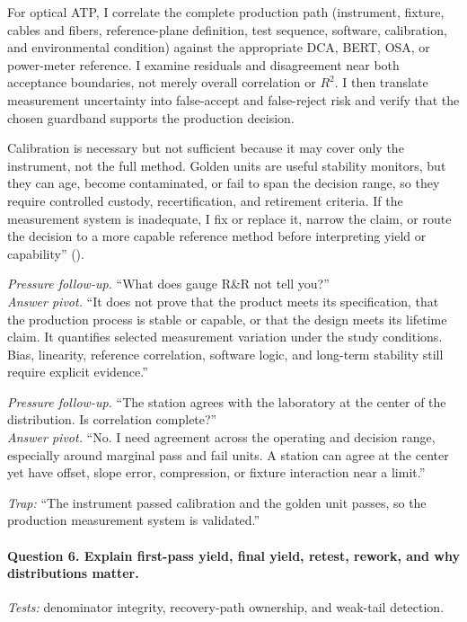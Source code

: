 For optical ATP, I correlate the complete production path (instrument, fixture,
cables and fibers, reference-plane definition, test sequence, software,
calibration, and environmental condition) against the appropriate DCA, BERT,
OSA, or power-meter reference. I examine residuals and disagreement
near both acceptance boundaries, not merely overall correlation or
$R^2$. I then translate measurement uncertainty into false-accept and
false-reject risk and verify that the chosen guardband supports the production
decision.

Calibration is necessary but not sufficient because it may cover only the
instrument, not the full method. Golden units are useful stability monitors,
but they can age, become contaminated, or fail to span the decision range, so
they require controlled custody, recertification, and retirement criteria. If
the measurement system is inadequate, I fix or replace it, narrow the claim, or
route the decision to a more capable reference method before interpreting
yield or capability''
().

\textit{Pressure follow-up.} ``What does gauge R\&R not tell you?''\\
\textit{Answer pivot.} ``It does not prove that the product meets its
specification, that the production process is stable or capable, or that the
design meets its lifetime claim. It quantifies selected measurement variation
under the study conditions. Bias, linearity, reference correlation, software
logic, and long-term stability still require explicit evidence.''

\textit{Pressure follow-up.} ``The station agrees with the laboratory at the
center of the distribution. Is correlation complete?''\\
\textit{Answer pivot.} ``No. I need agreement across the operating and decision
range, especially around marginal pass and fail units. A station can agree at
the center yet have offset, slope error, compression, or fixture interaction
near a limit.''

\textit{Trap:} ``The instrument passed calibration and the golden unit passes,
so the production measurement system is validated.''

\paragraph{Question 6. Explain first-pass yield, final yield, retest, rework,
and why distributions matter.}
\textit{Tests:} denominator integrity, recovery-path ownership, and weak-tail
detection.

